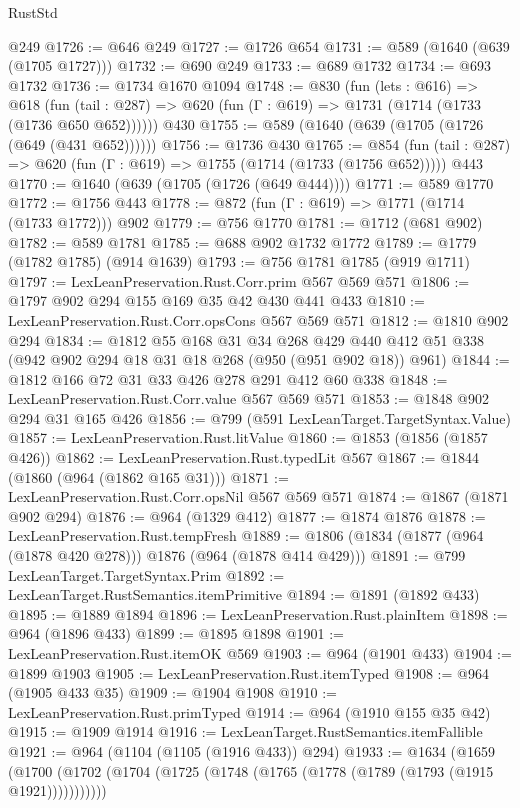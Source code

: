 \begin{lexlean}{RustStd}
\begin{coremodule}
{\begin{coremodule}
{{{{{{{{{    @249
@1726 := @646 @249
@1727 := @1726 @654
@1731 := @589 (@1640 (@639 (@1705 @1727)))
@1732 := @690 @249
@1733 := @689 @1732
@1734 := @693 @1732
@1736 := @1734 @1670 @1094
@1748 := @830
    (fun (lets : @616) =>
    @618 (fun (tail : @287) => @620 (fun (Γ : @619) => @1731 (@1714 (@1733 (@1736 @650 @652))))))
    @430
@1755 := @589 (@1640 (@639 (@1705 (@1726 (@649 (@431 @652))))))
@1756 := @1736 @430
@1765 := @854
    (fun (tail : @287) => @620 (fun (Γ : @619) => @1755 (@1714 (@1733 (@1756 @652)))))
    @443
@1770 := @1640 (@639 (@1705 (@1726 (@649 @444))))
@1771 := @589 @1770
@1772 := @1756 @443
@1778 := @872 (fun (Γ : @619) => @1771 (@1714 (@1733 @1772))) @902
@1779 := @756 @1770
@1781 := @1712 (@681 @902)
@1782 := @589 @1781
@1785 := @688 @902 @1732 @1772
@1789 := @1779 (@1782 @1785) (@914 @1639)
@1793 := @756 @1781 @1785 (@919 @1711)
@1797 := LexLeanPreservation.Rust.Corr.prim @567 @569 @571
@1806 := @1797 @902 @294 @155 @169 @35 @42 @430 @441 @433
@1810 := LexLeanPreservation.Rust.Corr.opsCons @567 @569 @571
@1812 := @1810 @902 @294
@1834 := @1812
    @55
    @168
    @31
    @34
    @268
    @429
    @440
    @412
    @51
    @338
    (@942 @902 @294 @18 @31 @18 @268 (@950 (@951 @902 @18)) @961)
@1844 := @1812 @166 @72 @31 @33 @426 @278 @291 @412 @60 @338
@1848 := LexLeanPreservation.Rust.Corr.value @567 @569 @571
@1853 := @1848 @902 @294 @31 @165 @426
@1856 := @799 (@591 LexLeanTarget.TargetSyntax.Value)
@1857 := LexLeanPreservation.Rust.litValue
@1860 := @1853 (@1856 (@1857 @426))
@1862 := LexLeanPreservation.Rust.typedLit @567
@1867 := @1844 (@1860 (@964 (@1862 @165 @31)))
@1871 := LexLeanPreservation.Rust.Corr.opsNil @567 @569 @571
@1874 := @1867 (@1871 @902 @294)
@1876 := @964 (@1329 @412)
@1877 := @1874 @1876
@1878 := LexLeanPreservation.Rust.tempFresh
@1889 := @1806 (@1834 (@1877 (@964 (@1878 @420 @278))) @1876 (@964 (@1878 @414 @429)))
@1891 := @799 LexLeanTarget.TargetSyntax.Prim
@1892 := LexLeanTarget.RustSemantics.itemPrimitive
@1894 := @1891 (@1892 @433)
@1895 := @1889 @1894
@1896 := LexLeanPreservation.Rust.plainItem
@1898 := @964 (@1896 @433)
@1899 := @1895 @1898
@1901 := LexLeanPreservation.Rust.itemOK @569
@1903 := @964 (@1901 @433)
@1904 := @1899 @1903
@1905 := LexLeanPreservation.Rust.itemTyped
@1908 := @964 (@1905 @433 @35)
@1909 := @1904 @1908
@1910 := LexLeanPreservation.Rust.primTyped
@1914 := @964 (@1910 @155 @35 @42)
@1915 := @1909 @1914
@1916 := LexLeanTarget.RustSemantics.itemFallible
@1921 := @964 (@1104 (@1105 (@1916 @433)) @294)
@1933 := @1634
    (@1659 (@1700 (@1702 (@1704 (@1725 (@1748 (@1765 (@1778 (@1789 (@1793 (@1915 @1921)))))))))))
}}}}}}}}}
\end{coremodule}}
\end{coremodule}
\end{lexlean}
